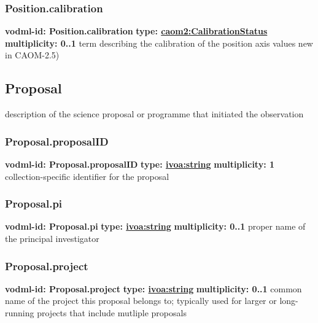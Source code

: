     \subsubsection{Position.calibration}
      \textbf{vodml-id: Position.calibration} \newline
      \textbf{type: \hyperref[sect:CalibrationStatus]{caom2:CalibrationStatus}} \newline
      \textbf{multiplicity: 0..1} \newline
      term describing the calibration of the position axis values new in CAOM-2.5)

  \subsection{Proposal}
  \label{sect:Proposal}
    description of the science proposal or programme that initiated the observation

    \subsubsection{Proposal.proposalID}
      \textbf{vodml-id: Proposal.proposalID} \newline
      \textbf{type: \hyperref[sect:ivoa]{ivoa:string}} \newline
      \textbf{multiplicity: 1} \newline
      collection-specific identifier for the proposal

    \subsubsection{Proposal.pi}
      \textbf{vodml-id: Proposal.pi} \newline
      \textbf{type: \hyperref[sect:ivoa]{ivoa:string}} \newline
      \textbf{multiplicity: 0..1} \newline
      proper name of the principal investigator

    \subsubsection{Proposal.project}
      \textbf{vodml-id: Proposal.project} \newline
      \textbf{type: \hyperref[sect:ivoa]{ivoa:string}} \newline
      \textbf{multiplicity: 0..1} \newline
      common name of the project this proposal belongs to; typically used for larger or long-running projects that include mutliple proposals


